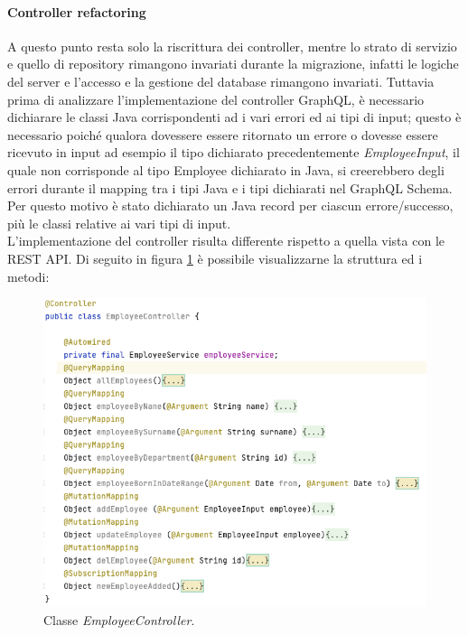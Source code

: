 \paragraph{Controller refactoring}
A questo punto resta solo la riscrittura dei controller, mentre lo strato di servizio e quello di repository rimangono invariati durante la migrazione, infatti le logiche del server e l'accesso e la gestione del database rimangono invariati. Tuttavia prima di analizzare l'implementazione del controller GraphQL, è necessario dichiarare le classi Java corrispondenti ad i vari errori ed ai tipi di input; questo è necessario poiché qualora dovessere essere ritornato un errore o dovesse essere ricevuto in input ad esempio il tipo dichiarato precedentemente \textit{EmployeeInput}, il quale non corrisponde al tipo Employee dichiarato in Java, si creerebbero degli errori durante il mapping tra i tipi Java e i tipi dichiarati nel GraphQL Schema. Per questo motivo è stato dichiarato un Java record per ciascun errore/successo, più le classi relative ai vari tipi di input.\\
L'implementazione del controller risulta differente rispetto a quella vista con le REST API. Di seguito in figura \ref{graphql-controller} è possibile visualizzarne la struttura ed i metodi:
\FloatBarrier
\begin{figure}[!ht]
\centering
\includegraphics[width=0.8\linewidth]{immagini/graphQLEmployeeController.png}
\caption{Classe \textit{EmployeeController}.}
\label{graphql-controller}
\end{figure}
\FloatBarrier
